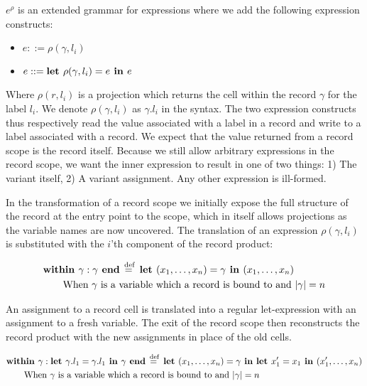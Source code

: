 $e^\rho$ is an extended grammar for expressions where we add the following
expression constructs:

\begin{itemize}

  \item $e ::= \rho(\gamma, l_i)$

  \item $e ::= \textbf{let } \rho(\gamma, l_i) = e \textbf{ in } e$

\end{itemize}

Where $\rho(r, l_i)$ is a projection which returns the cell within the record
$\gamma$ for the label $l_i$. We denote $\rho(\gamma, l_i)$ as $\gamma.l_i$ in
the syntax. The two expression constructs thus respectively read the value
associated with a label in a record and write to a label associated with a
record. We expect that the value returned from a record scope is the record
itself. Because we still allow arbitrary expressions in the record scope, we
want the inner expression to result in one of two things: 1) The variant
itself, 2) A variant assignment.  Any other expression is ill-formed.

In the transformation of a record scope we initially expose the full structure
of the record at the entry point to the scope, which in itself allows
projections as the variable names are now uncovered. The translation of an
expression $\rho(\gamma, l_i)$ is substituted with the $i$'th component of the
record product:

\begin{align*}
  &\textbf{within } \gamma : \gamma \textbf{ end} \stackrel{\>\text{def}}{=}\> \textbf{let } (x_1, \dots, x_n) = \gamma \textbf{ in } (x_1, \dots, x_n) \\
  &\qquad\text{When $\gamma$ is a variable which a record is bound to and $|\gamma| = n$}
\end{align*}

An assignment to a record cell is translated into a regular let-expression with
an assignment to a fresh variable. The exit of the record scope then
reconstructs the record product with the new assignments in place of the old
cells.

\begin{align*}
  &\textbf{within } \gamma : \textbf{let } \gamma . l_1 = \gamma . l_1 \textbf{ in } \gamma \textbf{ end} \stackrel{\>\text{def}}{=}\>
  \textbf{let } (x_1, \dots, x_n) = \gamma \textbf{ in } \textbf{let } x_1' = x_1 \textbf{ in } (x_1', \dots, x_n) \\
  &\qquad\text{When $\gamma$ is a variable which a record is bound to and $|\gamma| = n$}
\end{align*}

